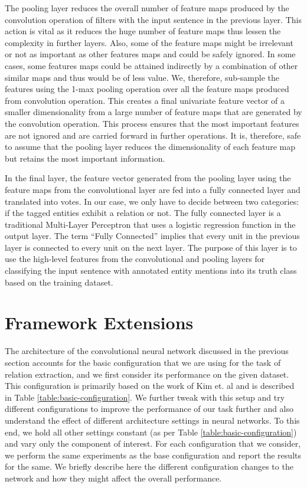 The pooling layer reduces the overall number of feature maps produced by the convolution operation of filters with the input sentence in the previous layer. This action is vital as it reduces the huge number of feature maps thus lessen the complexity in further layers. Also, some of the feature maps might be irrelevant or not as important as other features maps and could be safely ignored. In some cases, some features maps could be attained indirectly by a combination of other similar maps and thus would be of less value. We, therefore, sub-sample the features using the 1-max pooling operation over all the feature maps produced from convolution operation. This creates a final univariate feature vector of a smaller dimensionality from a large number of feature maps that are generated by the convolution operation. This process ensures that the most important features are not ignored and are carried forward in further operations. It is, therefore, safe to assume that the pooling layer reduces the dimensionality of each feature map but retains the most important information. 

In the final layer, the feature vector generated from the pooling layer using the feature maps from the convolutional layer are fed into a fully connected layer and translated into votes. In our case, we only have to decide between two categories: if the tagged entities exhibit a relation or not. The fully connected layer is a traditional Multi-Layer Perceptron that uses a logistic regression function in the output layer. The term ``Fully Connected'' implies that every unit in the previous layer is connected to every unit on the next layer. The purpose of this layer is to use the high-level features from the convolutional and pooling layers for classifying the input sentence with annotated entity mentions into its truth class based on the training dataset. 

\section{Framework Extensions}
\label{section:framework-extensions}
The architecture of the convolutional neural network discussed in the previous section accounts for the basic configuration that we are using for the task of relation extraction, and we first consider its performance on the given dataset. This configuration is primarily based on the work of Kim et. al \cite{kim2014convolutional} and is described in Table \ref{table:basic-configuration}. We further tweak with this setup and try different configurations to improve the performance of our task further and also understand the effect of different architecture settings in neural networks. To this end, we hold all other settings constant (as per Table \ref{table:basic-configuration}) and vary only the component of interest. For each configuration that we consider, we perform the same experiments as the base configuration and report the results for the same. We briefly describe here the different configuration changes to the network and how they might affect the overall performance.

